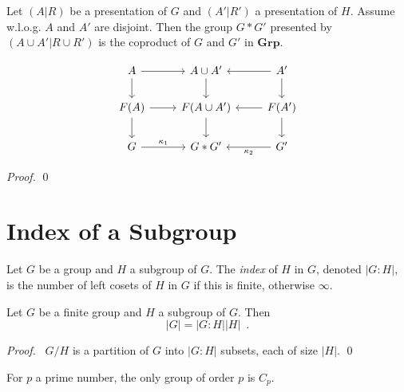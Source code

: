 \begin{prop}
Let $(A|R)$ be a presentation of $G$ and $(A'|R')$ a presentation of $H$. Assume w.l.o.g. $A$ and $A'$ are disjoint. Then the group $G * G'$ presented by $(A \cup A' | R \cup R')$ is the coproduct of $G$ and $G'$ in $\mathbf{Grp}$.
\end{prop}

\[ \begin{tikzcd}
A \arrow[d] \arrow[r] & A \cup A' \arrow[d] & A' \arrow[l] \arrow[d] \\
 F(A) \arrow[d] \arrow[r] & F(A \cup A') \arrow[d] & F(A') \arrow[l] \arrow[d] \\
G \arrow[r, "\kappa_1"] & G * G' & G' \arrow[l, "\kappa_2"]
\end{tikzcd} \]

\begin{proof}
\pf
{}
\qed
\end{proof}

\section{Index of a Subgroup}

\begin{df}[Index]
Let $G$ be a group and $H$ a subgroup of $G$. The \emph{index} of $H$ in $G$, denoted $|G:H|$, is the number of left cosets of $H$ in $G$ if this is finite, otherwise $\infty$.
\end{df}

\begin{thm}
Let $G$ be a finite group and $H$ a subgroup of $G$. Then
\[ |G| = |G : H| |H| \enspace . \]
\end{thm}

\begin{proof}
\pf\ $G/H$ is a partition of $G$ into $|G:H|$ subsets, each of size $|H|$. \qed
\end{proof}

\begin{cor}
For $p$ a prime number, the only group of order $p$ is $C_p$.
\end{cor}

